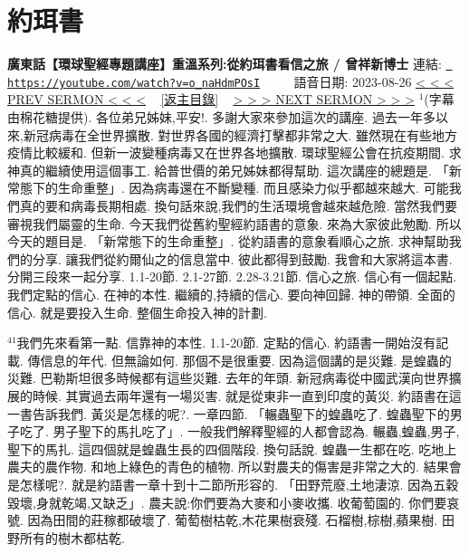\documentclass{book}
\begin{document}
\section{約珥書}
\label{sec:o_naHdmPOsI}
\textbf{廣東話【環球聖經專題講座】重溫系列:從約珥書看信之旅 / 曾祥新博士}
\newline
\newline
連結: \href{https://youtube.com/watch?v=o_naHdmPOsI}{\texttt{ https://youtube.com/watch?v=o\_naHdmPOsI}} ~~~~ 語音日期: 2023-08-26 
\newline
\newline
\hyperref[sec:8a3cVfOxFFc]{\small{< < < PREV SERMON < < <}}
~
\hyperref[sec:index]{\small{[返主目錄]}}
~
\hyperref[sec:9f0Ts61CPMI]{\small{> > > NEXT SERMON > > >}}
\newline
\newline
$^{1}$(字幕由棉花糖提供).
各位弟兄姊妹,平安!.
多謝大家來參加這次的講座.
過去一年多以來,新冠病毒在全世界擴散.
對世界各國的經濟打擊都非常之大.
雖然現在有些地方疫情比較緩和.
但新一波變種病毒又在世界各地擴散.
環球聖經公會在抗疫期間.
求神真的繼續使用這個事工.
給普世價的弟兄姊妹都得幫助.
這次講座的總題是.
「新常態下的生命重整」.
因為病毒還在不斷變種.
而且感染力似乎都越來越大.
可能我們真的要和病毒長期相處.
換句話來說,我們的生活環境會越來越危險.
當然我們要審視我們屬靈的生命.
今天我們從舊約聖經約語書的意象.
來為大家彼此勉勵.
所以今天的題目是.
「新常態下的生命重整」.
從約語書的意象看順心之旅.
求神幫助我們的分享.
讓我們從約爾仙之的信息當中.
彼此都得到鼓勵.
我會和大家將這本書.
分開三段來一起分享.
1.1-20節.
2.1-27節.
2.28-3.21節.
信心之旅.
信心有一個起點.
我們定點的信心.
在神的本性.
繼續的,持續的信心.
要向神回歸.
神的帶領.
全面的信心.
就是要投入生命.
整個生命投入神的計劃.

$^{41}$我們先來看第一點.
信靠神的本性.
1.1-20節.
定點的信心.
約語書一開始沒有記載.
傳信息的年代.
但無論如何.
那個不是很重要.
因為這個講的是災難.
是蝗蟲的災難.
巴勒斯坦很多時候都有這些災難.
去年的年頭.
新冠病毒從中國武漢向世界擴展的時候.
其實過去兩年還有一場災害.
就是從東非一直到印度的黃災.
約語書在這一書告訴我們.
黃災是怎樣的呢?.
一章四節.
「輾蟲聖下的蝗蟲吃了.
蝗蟲聖下的男子吃了.
男子聖下的馬扎吃了」.
一般我們解釋聖經的人都會認為.
輾蟲,蝗蟲,男子,聖下的馬扎.
這四個就是蝗蟲生長的四個階段.
換句話說.
蝗蟲一生都在吃.
吃地上農夫的農作物.
和地上綠色的青色的植物.
所以對農夫的傷害是非常之大的.
結果會是怎樣呢?.
就是約語書一章十到十二節所形容的.
「田野荒廢,土地淒涼.
因為五穀毀壞,身就乾竭,又缺乏」.
農夫說:你們要為大麥和小麥收攜.
收葡萄園的.
你們要哀號.
因為田間的莊稼都破壞了.
葡萄樹枯乾,木花果樹衰殘.
石榴樹,棕樹,蘋果樹.
田野所有的樹木都枯乾.
\end{document}
